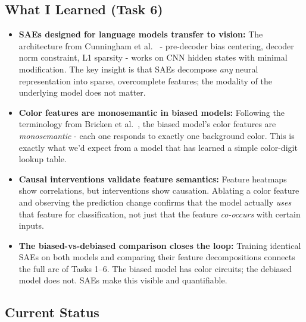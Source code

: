 \documentclass[9pt,a4paper,twocolumn,twoside]{tau-class/tau}
\begin{document}
    \subsection{What I Learned (Task 6)}

        \begin{itemize}
            \item \textbf{SAEs designed for language models transfer to vision:} The architecture from Cunningham et al.\ \cite{cunningham2023sparse} - pre-decoder bias centering, decoder norm constraint, L1 sparsity - works on CNN hidden states with minimal modification. The key insight is that SAEs decompose \textit{any} neural representation into sparse, overcomplete features; the modality of the underlying model does not matter.

            \item \textbf{Color features are monosemantic in biased models:} Following the terminology from Bricken et al.\ \cite{bricken2023monosemanticity}, the biased model's color features are \textit{monosemantic} - each one responds to exactly one background color. This is exactly what we'd expect from a model that has learned a simple color-digit lookup table.

            \item \textbf{Causal interventions validate feature semantics:} Feature heatmaps show correlations, but interventions show causation. Ablating a color feature and observing the prediction change confirms that the model actually \textit{uses} that feature for classification, not just that the feature \textit{co-occurs} with certain inputs.

            \item \textbf{The biased-vs-debiased comparison closes the loop:} Training identical SAEs on both models and comparing their feature decompositions connects the full arc of Tasks 1--6. The biased model has color circuits; the debiased model does not. SAEs make this visible and quantifiable.
        \end{itemize}

    \subsection{Current Status}
\end{document}
